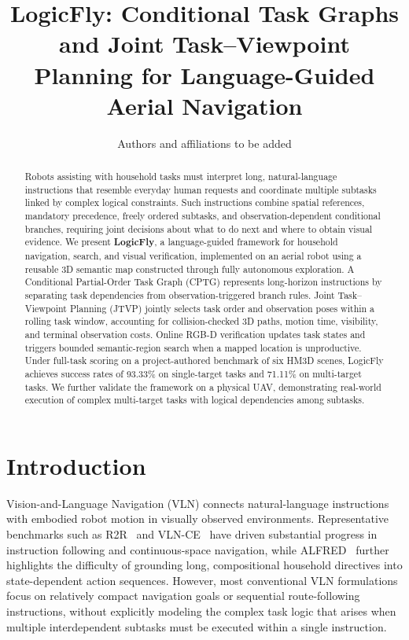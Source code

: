 \documentclass[letterpaper,10pt,conference]{ieeeconf}
\title{\LARGE\bf LogicFly: Conditional Task Graphs and Joint Task--Viewpoint\protect\\ Planning for Language-Guided Aerial Navigation}
\author{Authors and affiliations to be added}
\begin{document}
\maketitle
\thispagestyle{empty}
\pagestyle{empty}
\begin{abstract}
Robots assisting with household tasks must interpret long, natural-language instructions that resemble everyday human requests and coordinate multiple subtasks linked by complex logical constraints. Such instructions combine spatial references, mandatory precedence, freely ordered subtasks, and observation-dependent conditional branches, requiring joint decisions about what to do next and where to obtain visual evidence. We present \textbf{LogicFly}, a language-guided framework for household navigation, search, and visual verification, implemented on an aerial robot using a reusable 3D semantic map constructed through fully autonomous exploration. A Conditional Partial-Order Task Graph (CPTG) represents long-horizon instructions by separating task dependencies from observation-triggered branch rules. Joint Task--Viewpoint Planning (JTVP) jointly selects task order and observation poses within a rolling task window, accounting for collision-checked 3D paths, motion time, visibility, and terminal observation costs. Online RGB-D verification updates task states and triggers bounded semantic-region search when a mapped location is unproductive. Under full-task scoring on a project-authored benchmark of six HM3D scenes, LogicFly achieves success rates of 93.33\% on single-target tasks and 71.11\% on multi-target tasks. We further validate the framework on a physical UAV, demonstrating real-world execution of complex multi-target tasks with logical dependencies among subtasks.
\end{abstract}

\section{Introduction}
Vision-and-Language Navigation (VLN) connects natural-language instructions with embodied robot motion in visually observed environments. Representative benchmarks such as R2R~\cite{anderson2018r2r} and VLN-CE~\cite{krantz2020vlnce} have driven substantial progress in instruction following and continuous-space navigation, while ALFRED~\cite{shridhar2020alfred} further highlights the difficulty of grounding long, compositional household directives into state-dependent action sequences. However, most conventional VLN formulations focus on relatively compact navigation goals or sequential route-following instructions, without explicitly modeling the complex task logic that arises when multiple interdependent subtasks must be executed within a single instruction.
\end{document}
